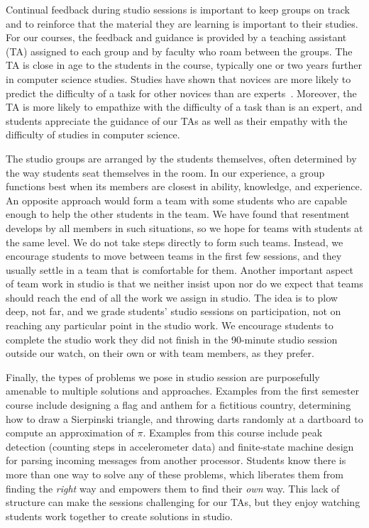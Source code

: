 Continual feedback during studio sessions is important to keep groups on
track and to reinforce that the material they are learning is important to
their studies.  For our courses, the feedback and guidance is provided by
a teaching assistant (TA) assigned to each group and by faculty who 
roam between the groups.  The TA is close in age to the students in the
course, typically one or two years further in computer science studies.
Studies have shown that novices are more likely to predict the difficulty
of a task for other novices than are experts~\cite{Hinds:1999}.  Moreover,
the TA is more likely to empathize with the difficulty of a task than is
an expert, and students appreciate the guidance of our TAs as well as their
empathy with the difficulty of studies in computer science.

The studio groups are arranged by the students themselves, often determined
by the way students seat themselves in the room. In our experience, a group
functions best when its members are closest in ability, knowledge, and
experience.  An opposite approach would form a team with some students who
are capable enough to help the other students in the team.  We have found
that resentment develops by all members in such situations, so we hope for
teams with students at the same level.   We do not take steps directly to
form such teams.  Instead, we encourage students to move between teams in
the first few sessions, and they usually settle in a team that is comfortable
for them.  Another important aspect of team work in studio is that we neither
insist upon nor do we expect that teams should reach the end of all the work
we assign in studio.  The idea is to plow deep, not far, and we grade
students' studio sessions on participation, 
not on reaching any particular point in the
studio work.  We encourage students to complete the studio work they did not
finish in the 90-minute studio session outside our watch, 
on their own or with team members,
as they prefer.

Finally, the types of problems we pose in studio session are purposefully
amenable to multiple solutions and approaches.  Examples from the
first semester course include designing
a flag and anthem for a fictitious country, determining how to draw a Sierpinski
triangle, and throwing darts randomly at a dartboard to compute an approximation
of $\pi$.
Examples from this course include peak detection (counting steps in
accelerometer data) and finite-state machine design for parsing
incoming messages from another processor.
Students know there is more than one way to solve any of these
problems, which liberates them from finding the \emph{right} way and
empowers them to find their \emph{own} way.  This lack of structure can make
the sessions challenging for our TAs, but they enjoy watching students work
together to create solutions in studio.

